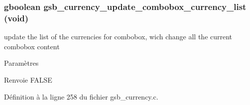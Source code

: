\subsubsection[{gsb\_\-currency\_\-update\_\-combobox\_\-currency\_\-list}]{\setlength{\rightskip}{0pt plus 5cm}gboolean gsb\_\-currency\_\-update\_\-combobox\_\-currency\_\-list (void)}\label{gsb__currency_8h_aa0749d5749e2bef8d4e3d4f19f5d4524}
update the list of the currencies for combobox, wich change all the current combobox content


\begin{DoxyParams}{Paramètres}
\item[{\em }]\end{DoxyParams}
\begin{DoxyReturn}{Renvoie}
FALSE 
\end{DoxyReturn}


Définition à la ligne 258 du fichier gsb\_\-currency.c.


